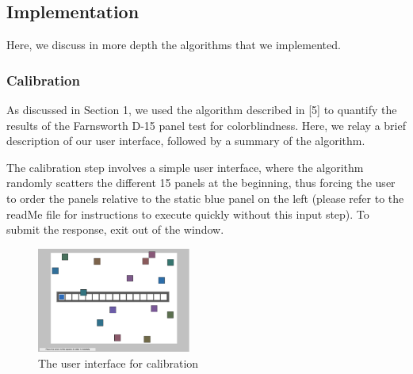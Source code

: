 \documentclass[10pt,twocolumn,letterpaper]{article}
\begin{document}
\subsection{Implementation}

Here, we discuss in more depth the algorithms that we implemented.

\subsubsection{Calibration}

As discussed in Section 1, we used the algorithm described in [5] to quantify the results of the Farnsworth D-15 panel test for colorblindness. Here, we relay a brief description of our user interface, followed by a summary of the algorithm.

The calibration step involves a simple user interface, where the algorithm randomly scatters the different 15 panels at the beginning, thus forcing the user to order the panels relative to the static blue panel on the left (please refer to the readMe file for instructions to execute quickly without this input step). To submit the response, exit out of the window.

\begin{figure}[h]
  \centering
  \includegraphics[width=0.45\textwidth]{panel.png}
  \caption{The user interface for calibration}
  \label{fig:panel}
\end{figure}
\end{document}
